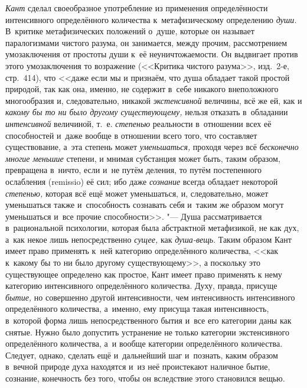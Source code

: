 {\em Кант} сделал своеобразное употребление из применения определённости
интенсивного определённого количества к~метафизическому определению {\em души}.
В~критике метафизических положений о~душе, которые он называет паралогизмами
чистого разума, он занимается, между прочим, рассмотрением умозаключения от
простоты души к~её неуничтожаемости. Он выдвигает против этого умозаключения то
возражение (<<Критика чистого разума>>, изд.~2-е, стр.~414), что <<даже если мы
и признаём, что душа обладает такой простой природой, так как она, именно, не
содержит в~себе никакого внеположного многообразия и, следовательно, никакой
{\em экстенсивной} величины, всё же ей, как и {\em какому бы то ни было другому
существующему,} нельзя отказать в~обладании {\em интенсивной} величиной, т.~е.
{\em степенью} реальности в~отношении всех её способностей и~даже вообще
в отношении всего того, что составляет существование, а~эта степень может
{\em уменьшаться,} проходя через всё {\em бесконечно многие меньшие} степени, и
мнимая субстанция может быть, таким образом, превращена в~ничто, если и~не
путём деления, то путём постепенного ослабления (remissio) её сил; ибо даже
{\em сознание} всегда обладает некоторой {\em степенью,} которая всё ещё может
уменьшаться, и, следовательно, может уменьшаться также и~способность сознавать
себя и~таким же образом могут уменьшаться и~все прочие способности>>. "--- Душа
рассматривается в~рациональной психологии, которая была абстрактной
метафизикой, не как дух, а~как некое лишь непосредственно {\em сущее,} как
{\em душа-вещь}. Таким образом Кант имеет право применять к~ней категорию
определённого количества, <<как к~какому бы то ни было другому существующему>>,
а поскольку это существующее определено как простое, Кант имеет право применять
к нему категорию интенсивного определённого количества. Духу, правда, присуще
{\em бытие,} но совершенно другой интенсивности, чем интенсивность интенсивного
определённого количества, а~именно, ему присуща такая интенсивность, в~которой
форма лишь непосредственного бытия и~все его категории даны как снятые. Нужно
было допустить устранение не только категории экстенсивного определённого
количества, а~и вообще категории определённого количества. Следует, однако,
сделать ещё и~дальнейший шаг и~познать, каким образом в~вечной природе духа
находятся и~из неё проистекают наличное бытие, сознание, конечность без того,
чтобы он вследствие этого становился вещью.


